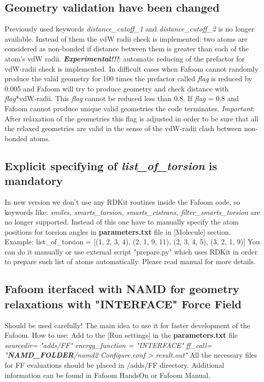 \documentclass[a4paper]{article}
\begin{document}
\subsection{Geometry validation have been changed}
Previously used keywords \textit{distance\_cutoff\_1} and \textit{distance\_cutoff\_2} is no longer available. Instead of them the vdW radii check is implemented: two atoms are considered as non-bonded if distance between them is greater than each of the atom's vdW radii.\newline
\textit{\textbf{Experimental!!!}}:\newline
automatic reducing of the prefactor for vdW-radii check is implemented. In difficult cases when Fafoom cannot randomly produce the valid geometry for 100 times the prefactor called \textit{flag} is reduced by 0.005 and Fafoom will try to produce geometry and check distance with \textit{flag}*vdW-radii. This \textit{flag} cannot be reduced less than 0.8. If \textit{flag} = 0.8 and Fafoom cannot produce unique valid geometries the code terminates.\newline
\textit{Important}: After relaxation of the geometries this flag is adjusted in order to be sure that all the relaxed geometries are valid in the sense of the vdW-radii clash between non-bonded atoms.
\subsection{Explicit specifying of \textit{list\_of\_torsion} is mandatory}
In new version we don't use any RDKit routines inside the Fafoom code, so keywords like:
\textit{smiles, smarts\_torsion, smarts\_cistrans, filter\_smarts\_torsion} are no longer supported. Instead of this one have to manually specify the atom positions for torsion angles in \textbf{parameters.txt} file in [Molecule] section. Example:\newline
list\_of\_torsion = [(1, 2, 3, 4), (2, 1, 9, 11), (2, 3, 4, 5), (3, 2, 1, 9)]\newline
You can do it manually or use external script "prepare.py" which uses RDKit in order to prepare such list of atoms automatically. Please read manual for more details.
\subsection{Fafoom iterfaced with NAMD for geometry relaxations with "INTERFACE" Force Field}
Should be used carefully! The main idea to use it for faster development of the Fafoom. How to use: Add to the [Run settings] in the \textbf{parameters.txt} file
\textit{sourcedir= "adds/FF"}\newline
\textit{energy\_function = "INTERFACE"}\newline
\textit{ff\_call= "\textbf{NAMD\_FOLDER}/namd2 Configure.conf > result.out"}\newline
All the necessary files for FF evaluations should be placed in /adds/FF directory. Additional information can be found in Fafoom HandsOn or Fafoom Manual.
\end{document}
